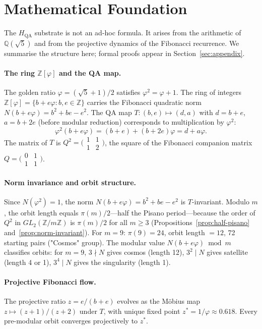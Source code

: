 \documentclass[11pt]{article}
\theoremstyle{definition}
\theoremstyle{remark}
\newcommand{\hqa}{H_{\mathrm{QA}}}
\newcommand{\Zfi}{\mathbb{Z}[\varphi]}
\newcommand{\Qfi}{\mathbb{Q}(\sqrt{5})}
\begin{document}
\section{Mathematical Foundation}
\label{sec:mathematical-foundation}

The $\hqa$ substrate is not an ad-hoc formula. It arises from the arithmetic of
$\Qfi$ and from the projective dynamics of the Fibonacci recurrence. We summarise
the structure here; formal proofs appear in Section~\ref{sec:appendix}.

\paragraph{The ring $\Zfi$ and the QA map.}
The golden ratio $\varphi=(\sqrt{5}+1)/2$ satisfies $\varphi^2=\varphi+1$. The ring
of integers $\Zfi=\{b+e\varphi : b,e\in\mathbb{Z}\}$ carries the Fibonacci quadratic
norm $N(b+e\varphi)=b^2+be-e^2$. The QA map $T:(b,e)\mapsto(d,a)$ with $d=b+e$,
$a=b+2e$ (before modular reduction) corresponds to multiplication by $\varphi^2$:
\[
  \varphi^2(b+e\varphi) = (b+e)+(b+2e)\varphi = d+a\varphi.
\]
The matrix of $T$ is $Q^2=\bigl(\begin{smallmatrix}1&1\\1&2\end{smallmatrix}\bigr)$,
the square of the Fibonacci companion matrix
$Q=\bigl(\begin{smallmatrix}0&1\\1&1\end{smallmatrix}\bigr)$.

\paragraph{Norm invariance and orbit structure.}
Since $N(\varphi^2)=1$, the norm $N(b+e\varphi)=b^2+be-e^2$ is $T$-invariant.
Modulo $m$, the orbit length equals $\pi(m)/2$---half the Pisano period---because
the order of $Q^2$ in $GL_2(\mathbb{Z}/m\mathbb{Z})$ is $\pi(m)/2$ for all $m\geq 3$
(Propositions~\ref{prop:half-pisano} and~\ref{prop:norm-invariant}).
For $m=9$: $\pi(9)=24$, orbit length $=12$, 72 starting pairs ("Cosmos" group).
The modular value $N(b+e\varphi)\bmod m$ classifies orbits: for $m=9$, $3\nmid N$
gives cosmos (length 12), $3^2\mid N$ gives satellite (length 4 or 1), $3^4\mid N$
gives the singularity (length 1).

\paragraph{Projective Fibonacci flow.}
The projective ratio $z=e/(b+e)$ evolves as the M\"obius map $z\mapsto(z+1)/(z+2)$
under $T$, with unique fixed point $z^*=1/\varphi\approx 0.618$. Every pre-modular
orbit converges projectively to $z^*$.
\end{document}
